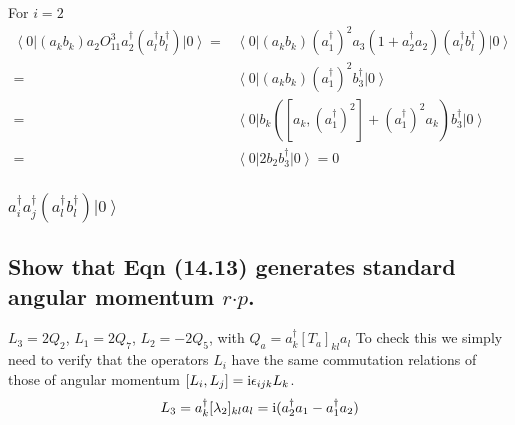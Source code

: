 \documentclass[main.tex]{subfiles}
\begin{document}
For $i=2$
\begin{align}
\left<0\right|(a_kb_k)a_2O^3_{11}a^{\dagger}_2(a^{\dagger}_l b^{\dagger}_l)\left|0\right>=&\left<0\right|(a_kb_k)(a^{\dagger}_1)^2a_3(1+a^{\dagger}_2a_2)(a^{\dagger}_l b^{\dagger}_l)\left|0\right>\\
=&\left<0\right|(a_kb_k)(a^{\dagger}_1)^2b^{\dagger}_3\left|0\right>\\
=&\left<0\right|b_k([a_k,(a^{\dagger}_1)^2]+(a^{\dagger}_1)^2a_k)b^{\dagger}_3\left|0\right>\\
=&\left<0\right|2b_2b^{\dagger}_3\left|0\right>=0
\end{align}

\subsubsection{$a^{\dagger}_ia^{\dagger}_j(a_l^{\dagger}b_l^{\dagger})\left|0\right>$}

\subsection{Show that Eqn (14.13) generates standard angular momentum \underline{$r$}$\cdot$\underline{$p$}.}
$L_3=2Q_2$, $L_1=2Q_7$, $L_2=-2Q_5$, with $Q_a=a^{\dagger}_k[T_a]_{kl}a_l$
To check this we simply need to verify that the operators $L_i$ have the same commutation relations of those of angular momentum $[L_i,L_j]=\mathrm{i} \epsilon_{ijk}L_k$.
\begin{equation}
L_3=a_k^{\dagger}[\lambda_2]_{kl}a_l=\mathrm{i}(a_2^{\dagger}a_1-a_1^{\dagger}a_2)
\end{equation}
\end{document}
